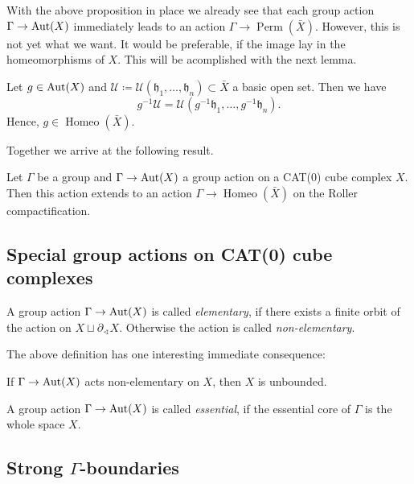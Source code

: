 With the above proposition in place we already see that each group action \(\Gamma \to \operatorname{Aut}(X)\) immediately leads to an action \(\Gamma \to \operatorname{Perm}(\bar X)\). However, this is not yet what we want. It would be preferable, if the image lay in the homeomorphisms of \(X\). This will be acomplished with the next lemma.

\begin{lemma}
  Let \(g \in \operatorname{Aut}(X)\) and \(\mathcal{U} \coloneqq \mathcal{U}(\mathfrak{h}_1, \dots, \mathfrak{h}_n) \subset \bar X\) a basic open set. Then we have
  \[
    g^{-1} \mathcal{U} = \mathcal{U}(g^{-1}\mathfrak{h}_1, \dots, g^{-1}\mathfrak{h}_n).
  \]
  Hence, \(g \in \operatorname{Homeo}(\bar X)\).
\end{lemma}

Together we arrive at the following result.

\begin{thm}
  \label{thm:roller-action}
  Let \(\Gamma\) be a group and \(\Gamma \to \operatorname{Aut}(X)\) a group action on a CAT(0) cube complex \(X\). Then this action extends to an action \(\Gamma \to \operatorname{Homeo}(\bar X)\) on the Roller compactification.
\end{thm}

\subsection{Special group actions on CAT(0) cube complexes}
\label{sec:special}

\begin{defin}
  A group action \(\Gamma \to \operatorname{Aut}(X)\) is called \emph{elementary}, if there exists a finite orbit of the action on \(X \sqcup \partial_{\sphericalangle}X\). Otherwise the action is called \emph{non-elementary}.
\end{defin}

The above definition has one interesting immediate consequence:
\begin{prop}
  \label{prop:ne-unbounded}
  If \(\Gamma \to \operatorname{Aut}(X)\) acts non-elementary on \(X\), then \(X\) is unbounded.
\end{prop}

\begin{defin}
  A group action \(\Gamma \to \operatorname{Aut}(X)\) is called \emph{essential}, if the essential core of \(\Gamma\) is the whole space \(X\).
\end{defin}

\subsection{Strong \(\Gamma\)-boundaries}
\label{sec:grp-boundary}

